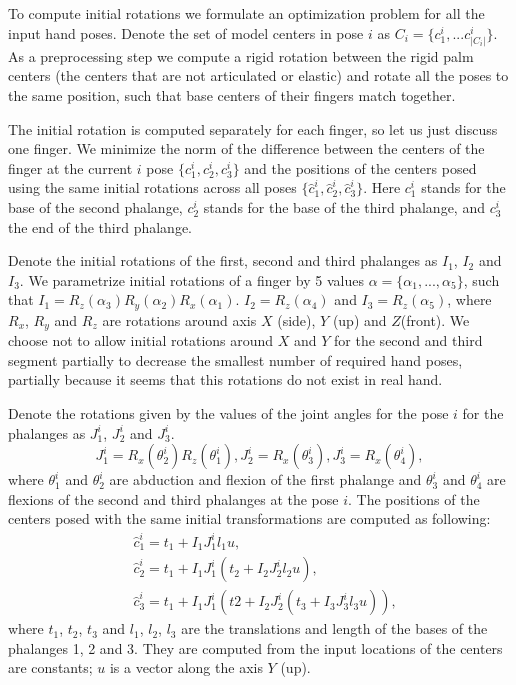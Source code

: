 \begin{DRAFT}
To compute initial rotations we formulate an optimization problem for all the input hand poses. Denote the set of model centers in pose $i$ as $C_i = \{c_1^i, ... c_{|C_i| }^i\}$. As a preprocessing step we compute a rigid rotation between the rigid palm centers (the centers that are not articulated or elastic) and rotate all the poses to the same position, such that base centers of their fingers match together.

The initial rotation is computed separately for each finger, so let us just discuss one finger. We minimize the norm of the difference between the centers of the finger at the current $i$ pose $\{c_1^i, c_2^i, c_3^i \}$ and the positions of the centers posed using the same initial rotations across all poses $\{\hat{c}_1^i, \hat{c}_2^i, \hat{c}_3^i \}$. Here $c_1^i$ stands for the base of the second phalange, $c_2^i$ stands for the base of the third phalange, and $c_3^i$ the end of the third phalange.

Denote the initial rotations of the first, second and third phalanges as $I_1$, $I_2$ and $I_3$. We parametrize initial rotations of a finger by 5 values $\alpha = \{\alpha_1, ..., \alpha_5\}$, such that $I_1 = R_z(\alpha_3) R_y(\alpha_2) R_x(\alpha_1).$  $I_2 = R_z(\alpha_4)$ and $I_3 = R_z(\alpha_5)$, where $R_x$, $R_y$ and $R_z$ are rotations around axis $X$ (side), $Y$ (up) and $Z$(front). We choose not to allow initial rotations around $X$ and $Y$ for the second and third segment partially to decrease the smallest number of required hand poses, partially because it seems that this rotations do not exist in real hand.

Denote the rotations given by the values of the joint angles for the pose $i$ for the phalanges as $J_1^i$, $J_2^i$ and $J_3^i$.
\begin{equation*}
J_1^i = R_x(\theta_2^i) R_z(\theta_1^i),
J_2^i = R_x(\theta_3^i),
J_3^i =  R_x(\theta_4^i),
\end{equation*}
where $\theta_1^i$ and $\theta_2^i$ are abduction and flexion of the first phalange and $\theta_3^i$ and $\theta_4^i$ are flexions of the second and third phalanges at the pose $i$. 
The positions of the centers posed with the same initial transformations are computed as following:
\begin{align*}
& \hat{c}_1^i =  t_1 + I_1   J_1^i    l_1  u, \\
& \hat{c}_2^i = t_1 + I_1    J_1^i   (t_2 + I_2  J_2^i  l_2  u), \\
&\hat{c}_3^i =  t_1 + I_1    J_1^i   (t2 +  I_2   J_2^i  (t_3 + I_3  J_3^i  l_3 u)),
\end{align*}
where $t_1$, $t_2$, $t_3$ and $l_1$, $l_2$, $l_3$ are the translations and length of the bases of the phalanges 1, 2 and 3. They are computed from the input locations of the centers are constants; $u$ is a vector along the axis $Y$ (up).
\end{DRAFT}

